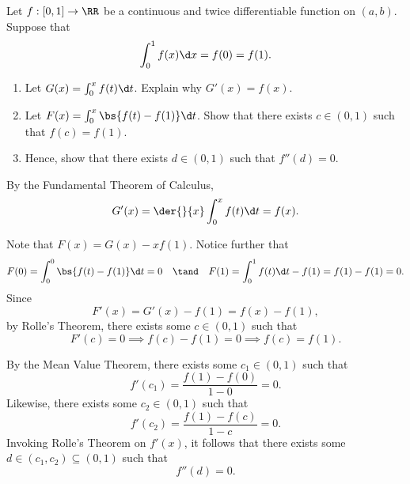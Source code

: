 \begin{problem}
    Let $f: [0, 1] \to \RR$ be a continuous and twice differentiable function on $(a, b)$. Suppose that \[\int_0^1 f(x) \d x = f(0) = f(1).\]
    
    \begin{enumerate}
        \item Let $G(x) = \int_0^x f(t) \d t$. Explain why $G'(x) = f(x)$.
        \item Let $F(x) = \int_0^x \bs{f(t) - f(1)} \d t$. Show that there exists $c \in (0, 1)$ such that $f(c) = f(1)$.
        \item Hence, show that there exists $d \in (0, 1)$ such that $f''(d) = 0$.
    \end{enumerate}
\end{problem}
\begin{solution}
    \begin{ppart}
        By the Fundamental Theorem of Calculus, \[G'(x) = \der{}{x} \int_0^x f(t) \d t = f(x).\]
    \end{ppart}
    \begin{ppart}
        Note that $F(x) = G(x) - x f(1)$. Notice further that \[F(0) = \int_0^0 \bs{f(t) - f(1)} \d t = 0 \quad \tand \quad F(1) = \int_0^1 f(t) \d t - f(1) = f(1) - f(1) = 0.\] Since \[F'(x) = G'(x) - f(1) = f(x) - f(1),\] by Rolle's Theorem, there exists some $c \in (0, 1)$ such that \[F'(c) = 0 \implies f(c) - f(1) = 0 \implies f(c) = f(1).\]
    \end{ppart}
    \begin{ppart}
        By the Mean Value Theorem, there exists some $c_1 \in (0, 1)$ such that \[f'(c_1) = \frac{f(1) - f(0)}{1 - 0} = 0.\] Likewise, there exists some $c_2 \in (0, 1)$ such that \[f'(c_2) = \frac{f(1) - f(c)}{1 - c} = 0.\] Invoking Rolle's Theorem on $f'(x)$, it follows that there exists some $d \in (c_1, c_2) \subseteq (0, 1)$ such that \[f''(d) = 0.\]
    \end{ppart}
\end{solution}

